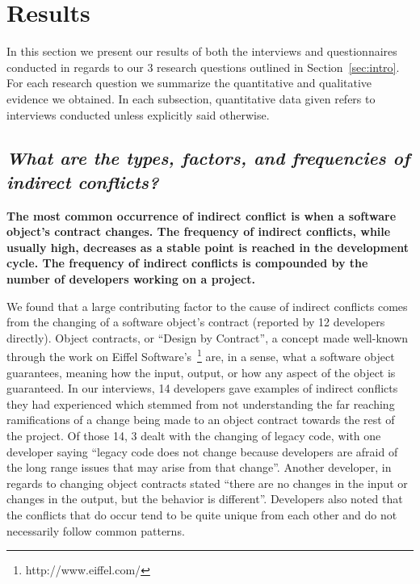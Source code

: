 \documentclass[conference]{IEEEtran}
\begin{document}
\section{Results}
\label{sec:results}

In this section we present our results of both the interviews and questionnaires conducted in regards to our 3 research questions
outlined in Section~\ref{sec:intro}. For each research question we summarize the quantitative and qualitative
evidence we obtained. In each subsection, quantitative data
given refers to interviews conducted unless explicitly said otherwise.

{}
\subsection*{ \it{What are the types, factors, and frequencies of indirect conflicts?}}

\bf{The most common occurrence of indirect conflict is when a software object's contract changes. The frequency of
indirect conflicts, while usually high, decreases as a stable point is reached in the development cycle. The frequency
of indirect conflicts is compounded by the number of developers working on a project.}

\normalfont{}

We found that a large contributing factor to the cause
of indirect conflicts comes from the changing of a software object's contract (reported by 12 developers directly). Object contracts, or ``Design by Contract''\texttrademark, a concept made well-known through the work on Eiffel Software's~\footnote{http://www.eiffel.com/} are, in a sense,
what a software object guarantees, meaning how the input, output, or how any aspect of the object is guaranteed.
In our interviews, 14 developers gave examples of indirect conflicts they had experienced
which stemmed from not understanding the far reaching ramifications of a change being made to an object contract
towards the rest of the project. Of those 14, 3 dealt
with the changing of legacy code, with one developer saying ``legacy code does not change because developers
are afraid of the long range issues that may arise from that change''. Another developer, in regards to changing
object contracts stated ``there are no changes in the input or changes in the output, but the behavior is different''.
Developers also noted that the conflicts that do occur tend to be quite unique from each other and do not necessarily
follow common patterns.
\end{document}

